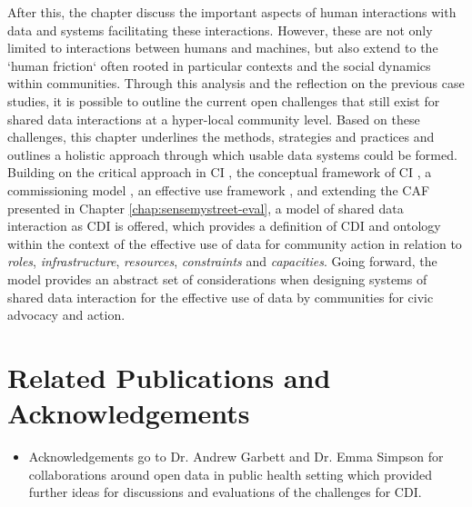 After this, the chapter discuss the important aspects of human interactions with data and systems facilitating these interactions. However, these are not only limited to interactions between humans and machines, but also extend to the `human friction` often rooted in particular contexts and the social dynamics within communities. Through this analysis and the reflection on the previous case studies, it is possible to outline the current open challenges that still exist for shared data interactions at a hyper-local community level. Based on these challenges, this chapter underlines the methods, strategies and practices and outlines a holistic approach through which usable data systems could be formed. Building on the critical approach in CI \citep{stillman_community_2009}, the conceptual framework of CI \citep{gurstein_toward_2012}, a commissioning model \citep{garbett_designing_2017}, an effective use framework \citep{gurstein_effective_2003}, and extending the CAF presented in Chapter \ref{chap:sensemystreet-eval}, a model of shared data interaction as CDI is offered, which provides a definition of CDI and ontology within the context of the effective use of data for community action in relation to \textit{roles}, \textit{infrastructure}, \textit{resources}, \textit{constraints} and \textit{capacities}. Going forward, the model provides an abstract set of considerations when designing systems of shared data interaction for the effective use of data by communities for civic advocacy and action.
\clearpage

\section*{Related Publications and Acknowledgements}
\begin{itemize}
\item Acknowledgements go to Dr. Andrew Garbett and Dr. Emma Simpson for collaborations around open data in public health setting which provided further ideas for discussions and evaluations of the challenges for CDI.
\end{itemize}
\clearpage

